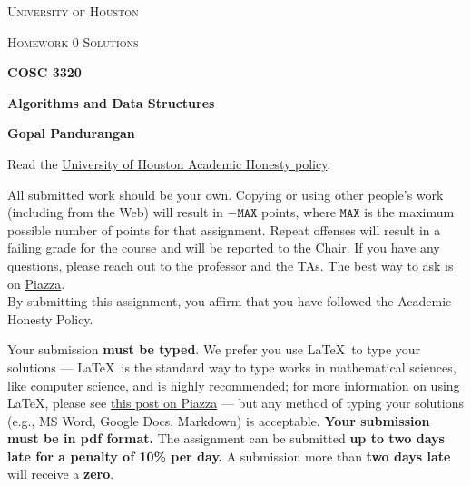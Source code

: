 \documentclass[draft]{article}
\begin{document}
\begin{titlepage}
    \begin{center}
        {\scshape\LARGE University of Houston\par}
        \vspace{1cm}
        {\scshape\Large Homework 0 Solutions \par}
        \vspace{1.5cm}
        {\huge\bfseries COSC 3320 \par}
        {\huge\bfseries Algorithms and Data Structures \par}
        \vspace{0.5cm}
        {\large\bfseries Gopal Pandurangan\par}
    \end{center}


    Read the \href{https://www.uh.edu/provost/policies-resources/honesty/_documents-honesty/academic-honesty-policy.pdf}{University of Houston Academic Honesty policy}.

    \begin{tcolorbox}[title=Academic Honesty Policy,colback=red!15,colframe=red!65!black,fonttitle=\bfseries]All submitted work should be your own. Copying or using other people's work (including from the Web) will result in \(-\texttt{MAX}\) points, where \(\texttt{MAX}\) is the maximum possible number of points for that assignment. Repeat offenses will result in a failing grade for the course and will be reported to the Chair. If you have any questions, please reach out to the professor and the TAs. The best way to ask is on \href{https://piazza.com/uh/spring2021/cosc3320/home}{Piazza}.\\

        By submitting this assignment, you affirm that you have followed the Academic Honesty Policy.
    \end{tcolorbox}

    Your submission \textbf{must be typed}. We prefer you use \LaTeX~to type your solutions --- \LaTeX~is the standard way to type works in mathematical sciences, like computer science, and is highly recommended; for more information on using \LaTeX, please see \href{https://piazza.com/class/kjxhee6ctqe6cj?cid=8}{this post on Piazza} --- but any method of typing your solutions (e.g., MS Word, Google Docs, Markdown) is acceptable. \textbf{Your submission must be in pdf format.} The assignment can be submitted \textbf{up to two days late for a penalty of 10\% per day.} A submission more than \textbf{two days late} will receive a \textbf{zero}.


\end{titlepage}
\end{document}
